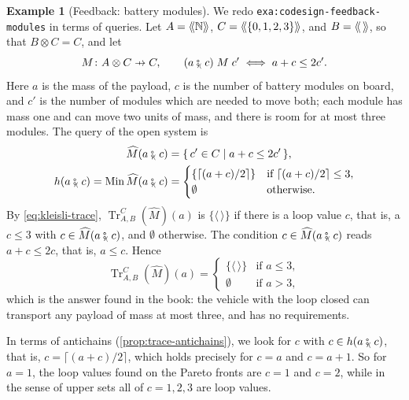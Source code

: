 \documentclass[11pt,a4paper]{article}
\theoremstyle{plain}
\theoremstyle{definition}
\newtheorem{example}[theorem]{Example}
\theoremstyle{remark}
\providecommand{\llangle}{\mathopen{\langle\mkern-3.5mu\langle}}
\providecommand{\rrangle}{\mathclose{\rangle\mkern-3.5mu\rangle}}
\newcommand{\tL}[1]{\llangle #1 \rrangle}
\newcommand{\tc}{\mathbin{\fatsemi_{\!\scriptscriptstyle\langle}}}
\newcommand{\etup}{\langle\,\rangle}
\newcommand{\profto}{\mathrel{\ooalign{\hfil$\mapstochar\mkern 5mu$\hfil\cr$\to$\cr}}}
\newcommand{\rel}[3]{#1 \mathrel{#2} #3}
\DeclareMathOperator{\Min}{Min}
\DeclareMathOperator{\Tr}{Tr}
\newcommand{\N}{\mathbb{N}}
\newcommand{\lbl}[1]{\nolinkurl{#1}}
\begin{document}
\begin{example}[Feedback: battery modules]
    \label{exa:modules}
    We redo \lbl{exa:codesign-feedback-modules} in terms of queries.
    Let $A = \tL{\N}$, $C = \tL{\{0,1,2,3\}}$, and $B = \tL{\,}$, so that $B \otimes C = C$, and let
    \begin{equation*}
        M \colon A \otimes C \profto C,
        \qquad
        \rel{(a \tc c)}{M}{c'} \iff a + c \leq 2c'.
    \end{equation*}
    Here $a$ is the mass of the payload, $c$ is the number of battery modules on board, and $c'$ is the number of modules which are needed to move both; each module has mass one and can move two units of mass, and there is room for at most three modules.
    The query of the open system is
    \begin{align*}
        \widehat{M}(a \tc c) & = \{\, c' \in C \mid a + c \leq 2c' \,\}, \\
        h(a \tc c) = \Min \widehat{M}(a \tc c) & =
        \begin{cases}
            \{ \lceil (a+c)/2 \rceil \} & \text{if } \lceil (a+c)/2 \rceil \leq 3, \\
            \emptyset & \text{otherwise.}
        \end{cases}
    \end{align*}
    By \cref{eq:kleisli-trace}, $\Tr^{C}_{A,B}(\widehat{M})(a)$ is $\{\etup\}$ if there is a loop value $c$, that is, a $c \leq 3$ with $c \in \widehat{M}(a \tc c)$, and $\emptyset$ otherwise.
    The condition $c \in \widehat{M}(a \tc c)$ reads $a + c \leq 2c$, that is, $a \leq c$.
    Hence
    \begin{equation*}
        \Tr^{C}_{A,B}(\widehat{M})(a) =
        \begin{cases}
            \{\etup\} & \text{if } a \leq 3, \\
            \emptyset & \text{if } a > 3,
        \end{cases}
    \end{equation*}
    which is the answer found in the book: the vehicle with the loop closed can transport any payload of mass at most three, and has no requirements.

    In terms of antichains (\cref{prop:trace-antichains}), we look for $c$ with $c \in h(a \tc c)$, that is, $c = \lceil (a+c)/2 \rceil$, which holds precisely for $c = a$ and $c = a + 1$.
    So for $a = 1$, the loop values found on the Pareto fronts are $c = 1$ and $c = 2$, while in the sense of upper sets all of $c = 1, 2, 3$ are loop values.
\end{example}
\end{document}
